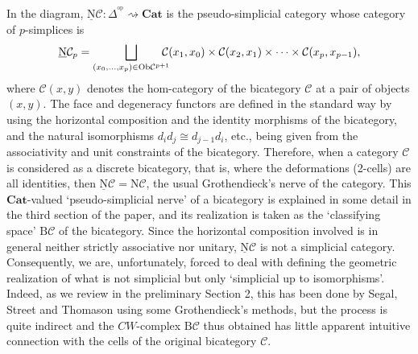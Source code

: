 \documentclass[]{amsart}
\begin{document}
In the diagram, ${\ensuremath{\underline{\mathrm{N}}}}{\ensuremath{\mathcal{C}}}:\Delta^{\!{^\mathrm{op}}} \rightsquigarrow {\ensuremath{\mathbf{Cat}}}$ is the pseudo-simplicial
category whose category of $p$-simplices is
$$
{\ensuremath{\underline{\mathrm{N}}}}{\ensuremath{\mathcal{C}}}_p = \bigsqcup_{(x_0,\ldots,x_p)\in \mbox{\scriptsize Ob}{\ensuremath{\mathcal{C}}}^{p+1}}\hspace{-0.3cm}
{\ensuremath{\mathcal{C}}}(x_1,x_0)\times{\ensuremath{\mathcal{C}}}(x_2,x_1)\times\cdots\times{\ensuremath{\mathcal{C}}}(x_p,x_{p-1}),
$$
where ${\ensuremath{\mathcal{C}}}(x,y)$ denotes the hom-category of the bicategory ${\ensuremath{\mathcal{C}}}$ at a pair of objects $(x,y)$. The
face and degeneracy functors are defined in the standard way by using the horizontal composition
and the identity morphisms of the bicategory,  and the natural isomorphisms $d_id_j\cong
d_{j-1}d_i$, etc., being given from the associativity and unit constraints of the bicategory.
Therefore, when a category ${\ensuremath{\mathcal{C}}}$ is considered as a discrete bicategory, that is, where the
deformations (2-cells) are all identities, then ${\ensuremath{\underline{\mathrm{N}}}}{\ensuremath{\mathcal{C}}}={\ensuremath{\mathrm{N}}} {\ensuremath{\mathcal{C}}}$, the usual Grothendieck's nerve
of the category. This ${\ensuremath{\mathbf{Cat}}}$-valued `pseudo-simplicial nerve' of a bicategory is explained in some
detail in the third section of the paper, and its realization is taken as the `classifying space'
${\ensuremath{\mathrm{B}}} {\ensuremath{\mathcal{C}}}$ of the bicategory. Since the horizontal composition involved is in general neither
strictly associative nor unitary, ${\ensuremath{\underline{\mathrm{N}}}}{\ensuremath{\mathcal{C}}}$ is not a simplicial category. Consequently, we are,
unfortunately, forced to deal with defining the geometric realization of what is not simplicial but
only `simplicial up to isomorphisms'. Indeed, as we review in the preliminary Section 2, this has
been done by Segal, Street and Thomason using some Grothendieck's methods, but the process is quite
indirect and the $CW$-complex ${\ensuremath{\mathrm{B}}}{\ensuremath{\mathcal{C}}}$ thus obtained has little apparent intuitive connection
with the cells of the original bicategory ${\ensuremath{\mathcal{C}}}$.
\end{document}
